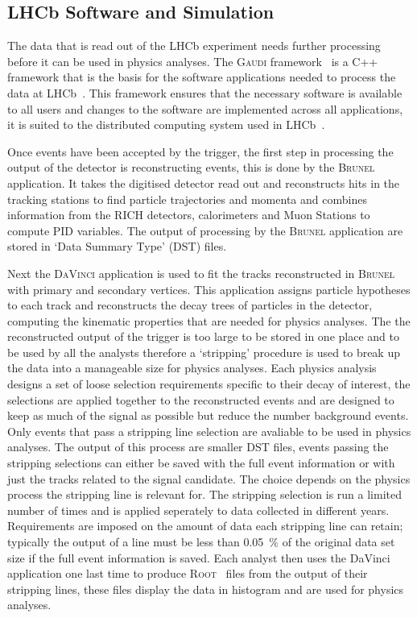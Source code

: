 \subsection{LHCb Software and Simulation}
\label{Software_Simulation}

The data that is read out of the LHCb experiment needs further processing before it can be used in physics analyses. The \textsc{Gaudi} framework~\cite{Mato:1998gfa} is a C++ framework that is the basis for the software applications needed to process the data at LHCb~\cite{Antunes-Nobrega:835156}. This framework ensures that the necessary software is available to all users and changes to the software are implemented across all applications, it is suited to the distributed computing system used in LHCb~\cite{Stagni:2012rs}. 


Once events have been accepted by the trigger, the first step in processing the output of the detector is reconstructing events, this is done by the \textsc{Brunel} application. It takes the digitised detector read out and reconstructs hits in the tracking stations to find particle trajectories and momenta and combines information from the RICH detectors, calorimeters and Muon Stations to compute PID variables. The output of processing by the \textsc{Brunel} application are stored in `Data Summary Type' (DST) files. 

Next the \textsc{DaVinci} application is used to fit the tracks reconstructed in \textsc{Brunel} with primary and secondary vertices. This application assigns particle hypotheses to each track and reconstructs the decay trees of particles in the detector, computing the kinematic properties that are needed for physics analyses. The the reconstructed output of the trigger is too large to be stored in one place and to be used by all the analysts therefore a `stripping' procedure is used to break up the data into a manageable size for physics analyses. Each physics analysis designs a set of loose selection requirements specific to their decay of interest, the selections are applied together to the reconstructed events and are designed to keep as much of the signal as possible but reduce the number background events. Only events that pass a stripping line selection are avaliable to be used in physics analyses. The output of this process are smaller DST files, events passing the stripping selections can either be saved with the full event information or with just the tracks related to the signal candidate. The choice depends on the physics process the stripping line is relevant for. The stripping selection is run a limited number of times and is applied seperately to data collected in different years. Requirements are imposed on the amount of data each stripping line can retain; typically  the output of a line must be less than 0.05~$\%$ of the original data set size if the full event information is saved. Each analyst then uses the DaVinci application one last time to produce \textsc{Root}~\cite{Brun:1997pa} files from the output of their stripping lines, these files display the data in histogram and are used for physics analyses. %


